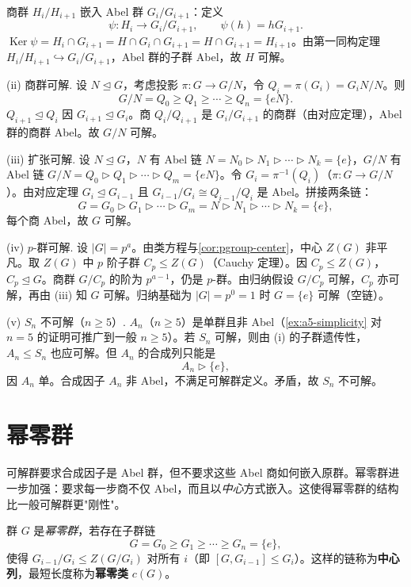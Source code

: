 商群 $H_i/H_{i+1}$ 嵌入 Abel 群 $G_i/G_{i+1}$：定义
\[
\psi:H_i\to G_i/G_{i+1},\qquad\psi(h)=hG_{i+1}.
\]
$\operatorname{Ker}\psi=H_i\cap G_{i+1}=H\cap G_i\cap G_{i+1}=H\cap G_{i+1}=H_{i+1}$。由第一同构定理 $H_i/H_{i+1}\hookrightarrow G_i/G_{i+1}$，Abel 群的子群 Abel，故 $H$ 可解。

(ii) 商群可解. 设 $N\mathrel{\trianglelefteq} G$，考虑投影 $\pi:G\to G/N$，令 $Q_i=\pi(G_i)=G_iN/N$。则
\[
G/N=Q_0\ge Q_1\ge\cdots\ge Q_n=\{eN\}.
\]
$Q_{i+1}\mathrel{\trianglelefteq} Q_i$ 因 $G_{i+1}\mathrel{\trianglelefteq} G_i$。商 $Q_i/Q_{i+1}$ 是 $G_i/G_{i+1}$ 的商群（由对应定理），Abel 群的商群 Abel。故 $G/N$ 可解。

(iii) 扩张可解. 设 $N\mathrel{\trianglelefteq} G$，$N$ 有 Abel 链 $N=N_0\rhd N_1\rhd\cdots\rhd N_k=\{e\}$，$G/N$ 有 Abel 链 $G/N=Q_0\rhd Q_1\rhd\cdots\rhd Q_m=\{eN\}$。令 $G_i=\pi^{-1}(Q_i)$（$\pi:G\to G/N$）。由对应定理 $G_i\mathrel{\trianglelefteq} G_{i-1}$ 且 $G_{i-1}/G_i\cong Q_{i-1}/Q_i$ 是 Abel。拼接两条链：
\[
G=G_0\rhd G_1\rhd\cdots\rhd G_m=N\rhd N_1\rhd\cdots\rhd N_k=\{e\},
\]
每个商 Abel，故 $G$ 可解。

(iv) $p$-群可解. 设 $|G|=p^a$。由类方程与\cref{cor:pgroup-center}，中心 $Z(G)$ 非平凡。取 $Z(G)$ 中 $p$ 阶子群 $C_p\le Z(G)$（Cauchy 定理）。因 $C_p\le Z(G)$，$C_p\mathrel{\trianglelefteq} G$。商群 $G/C_p$ 的阶为 $p^{a-1}$，仍是 $p$-群。由归纳假设 $G/C_p$ 可解，$C_p$ 亦可解，再由 (iii) 知 $G$ 可解。归纳基础为 $|G|=p^0=1$ 时 $G=\{e\}$ 可解（空链）。

(v) $S_n$ 不可解（$n\ge5$）. $A_n$（$n\ge5$）是单群且非 Abel（\cref{ex:a5-simplicity} 对 $n=5$ 的证明可推广到一般 $n\ge5$）。若 $S_n$ 可解，则由 (i) 的子群遗传性，$A_n\le S_n$ 也应可解。但 $A_n$ 的合成列只能是
\[
A_n\rhd\{e\},
\]
因 $A_n$ 单。合成因子 $A_n$ 非 Abel，不满足可解群定义。矛盾，故 $S_n$ 不可解。
\par\medskip

\section{幂零群}
\label{sec:nilpotent}

可解群要求合成因子是 Abel 群，但不要求这些 Abel 商如何嵌入原群。幂零群进一步加强：要求每一步商不仅 Abel，而且以\emph{中心}方式嵌入。这使得幂零群的结构比一般可解群更"刚性"。

\begin{definition}[幂零群与中心列]
群 $G$ 是\emph{幂零群}，若存在子群链
\[
G=G_0\ge G_1\ge\cdots\ge G_n=\{e\},
\]
使得 $G_{i-1}/G_i\le Z(G/G_i)$ 对所有 $i$（即 $[G,G_{i-1}]\le G_i$）。这样的链称为\textbf{中心列}，最短长度称为\textbf{幂零类} $c(G)$。
\end{definition}

